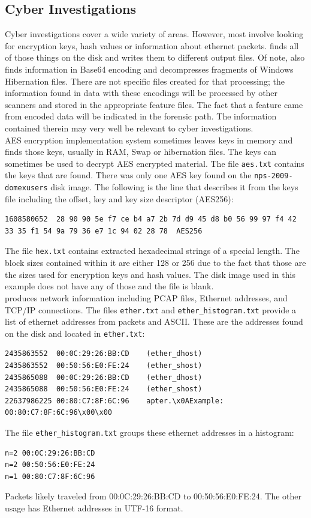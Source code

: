 \subsection{Cyber Investigations}
Cyber investigations cover a wide variety of areas. However, most involve looking for encryption keys, hash values or information about ethernet packets. \bulk finds all of those things on the disk and writes them to different output files. Of note, \bulk also finds information in Base64 encoding and decompresses fragments of Windows Hibernation files. There are not specific files created for that processing; the information found in data with these encodings will be processed by other scanners and stored in the appropriate feature files. The fact that a feature came from encoded data will be indicated in the forensic path. The information contained therein may very well be relevant to cyber investigations.\\

AES encryption implementation system sometimes leaves keys in memory and \bulk finds those keys, usually in RAM, Swap or hibernation files. The keys can sometimes be used to decrypt AES encrypted material. The file \texttt{aes.txt} contains the keys that are found. There was only one AES key found on the \texttt{nps-2009-domexusers} disk image. The following is the line that describes it from the keys file including the offset, key and key size descriptor (AES256):
\lstset{style=customfile}
\begin{lstlisting}
1608580652	28 90 90 5e f7 ce b4 a7 2b 7d d9 45 d8 b0 56 99 97 f4 42
33 35 f1 54 9a 79 36 e7 1c 94 02 28 78 	AES256
\end{lstlisting}

The file \texttt{hex.txt} contains extracted hexadecimal strings of a special length. The block sizes contained within it are either 128 or 256 due to the fact that those are the sizes used for encryption keys and hash values. The disk image used in this example does not have any of those and the file is blank.\\

\bulk produces network information including PCAP files, Ethernet addresses, and TCP/IP connections. The files \texttt{ether.txt} and \texttt{ether\_histogram.txt} provide a list of ethernet  addresses from packets and ASCII. These are the addresses found on the disk and located in \texttt{ether.txt}:
\lstset{style=customfile}
\begin{lstlisting}
2435863552	00:0C:29:26:BB:CD	 (ether_dhost)
2435863552	00:50:56:E0:FE:24	 (ether_shost)
2435865088	00:0C:29:26:BB:CD	 (ether_dhost)
2435865088	00:50:56:E0:FE:24	 (ether_shost)
22637986225	00:80:C7:8F:6C:96	 apter.\x0AExample: 00:80:C7:8F:6C:96\x00\x00
\end{lstlisting}
The file \texttt{ether\_histogram.txt} groups these ethernet addresses in a histogram:
\lstset{style=customfile}
\begin{lstlisting}
n=2	00:0C:29:26:BB:CD
n=2	00:50:56:E0:FE:24
n=1	00:80:C7:8F:6C:96
\end{lstlisting}
Packets likely traveled from 00:0C:29:26:BB:CD to 00:50:56:E0:FE:24.  The other usage has Ethernet addresses in UTF-16 format.\\

